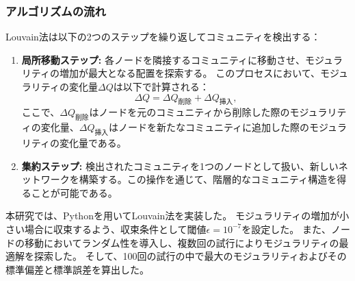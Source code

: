 \subsubsection{アルゴリズムの流れ}
Louvain法は以下の2つのステップを繰り返してコミュニティを検出する：
\begin{enumerate}
    \item \textbf{局所移動ステップ:} 各ノードを隣接するコミュニティに移動させ、モジュラリティの増加が最大となる配置を探索する。
    このプロセスにおいて、モジュラリティの変化量$\Delta Q$は以下で計算される：
    \begin{equation}
    \Delta Q = \Delta Q_{\text{削除}} + \Delta Q_{\text{挿入}},
    \end{equation}
    ここで、$\Delta Q_{\text{削除}}$はノードを元のコミュニティから削除した際のモジュラリティの変化量、$\Delta Q_{\text{挿入}}$はノードを新たなコミュニティに追加した際のモジュラリティの変化量である。
    \item \textbf{集約ステップ:} 検出されたコミュニティを1つのノードとして扱い、新しいネットワークを構築する。この操作を通じて、階層的なコミュニティ構造を得ることが可能である。
\end{enumerate}

本研究では、Pythonを用いてLouvain法を実装した。
モジュラリティの増加が小さい場合に収束するよう、収束条件として閾値$\epsilon = 10^{-7}$を設定した。
また、ノードの移動においてランダム性を導入し、複数回の試行によりモジュラリティの最適解を探索した。
そして、100回の試行の中で最大のモジュラリティおよびその標準偏差と標準誤差を算出した。